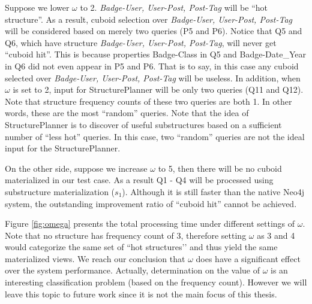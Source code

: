 	Suppose we lower $\omega$ to 2. \textit{Badge-User, User-Post, Post-Tag} will be ``hot structure''. As a result, cuboid selection over \textit{Badge-User, User-Post, Post-Tag} will be considered based on merely two queries (P5 and P6). Notice that Q5 and Q6, which have structure \textit{Badge-User, User-Post, Post-Tag}, will never get ``cuboid hit''. This is because properties Badge-Class in Q5 and Badge-Date\_Year in Q6 did not even appear in P5 and P6. That is to say, in this case any cuboid selected over \textit{Badge-User, User-Post, Post-Tag} will be useless. In addition, when $\omega$ is set to 2, input for StructurePlanner will be only two queries (Q11 and Q12). Note that structure frequency counts of these two queries are both 1. In other words, these are the most ``random'' queries. Note that the idea of StructurePlanner is to discover of useful substructures based on a sufficient number of ``less hot'' queries. In this case, two ``random'' queries are not the ideal input for the StructurePlanner.
	
	On the other side, suppose we increase $\omega$ to 5, then there will be no cuboid materialized in our test case. As a result Q1 - Q4 will be processed using substructure materialization ($s_1$). Although it is still faster than the native Neo4j system, the outstanding improvement ratio of ``cuboid hit'' cannot be achieved.
	
	Figure \ref{fig:omega} presents the total processing time under different settings of $\omega$. Note that no structure has frequency count of 3, therefore setting $\omega$ as 3 and 4 would categorize the same set of ``hot structures’’ and thus yield the same materialized views. We reach our conclusion that $\omega$ does have a significant effect over the system performance. Actually, determination on the value of $\omega$ is an interesting classification problem (based on the frequency count). However we will leave this topic to future work since it is not the main focus of this thesis.
	

